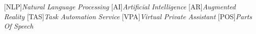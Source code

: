 \documentclass[a4paper,11pt,svgnames]{book}
\begin{document}
\newcommand\litem[1]{\item{\bfseries #1 }}
\renewcommand{\arraystretch}{1.5} %

\newcommand\headcell[1]{%
  \multicolumn{1}{|c|}{\cellcolor{DodgerBlue}\bfseries\sffamily\textcolor{white}{#1}}
}

[NLP]{\emph{Natural Language Processing}}
[AI]{\emph{Artificial Intelligence}}
[AR]{\emph{Augmented Reality}}
[TAS]{\emph{Task Automation Service}}
[VPA]{\emph{Virtual Private Assistant}}
[POS]{\emph{Parts Of Speech}}

	




%




\pagestyle{fancy}
\fancyhf{}
\fancyhead[RO]{\sffamily \slshape \rightmark}
\fancyhead[LE]{\sffamily \slshape \leftmark}
\fancyfoot[OR,EL]{\rmfamily \thepage} %









\appendix

\nocite{*}

{
\small

}

\end{document}
